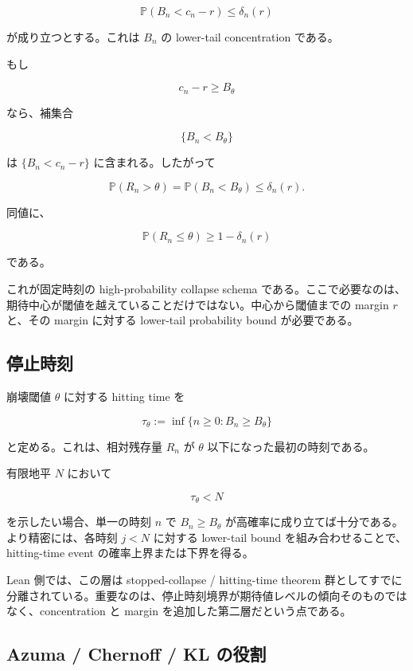 \documentclass[12pt,a4paper]{article}
\begin{document}
\[
\mathbb P(B_{n} < c_{n}-r) \le \delta_{n}(r)
\]

が成り立つとする。これは \(B_{n}\) の lower-tail concentration である。

もし

\[
c_{n}-r \ge B_\theta
\]

なら、補集合

\[
\{B_{n} < B_\theta\}
\]

は \(\{B_{n} < c_{n}-r\}\) に含まれる。したがって

\[
\mathbb P(R_{n} > \theta) = \mathbb P(B_{n} < B_\theta) \le \delta_{n}(r).
\]

同値に、

\[
\mathbb P(R_{n} \le \theta) \ge 1-\delta_{n}(r)
\]

である。

これが固定時刻の high-probability collapse schema である。ここで必要なのは、期待中心が閾値を越えていることだけではない。中心から閾値までの margin \(r\) と、その margin に対する lower-tail probability bound が必要である。

\subsection{停止時刻}\label{ux505cux6b62ux6642ux523b}

崩壊閾値 \(\theta\) に対する hitting time を

\[
\tau_\theta := \inf\{n \ge 0 : B_{n} \ge B_\theta\}
\]

と定める。これは、相対残存量 \(R_{n}\) が \(\theta\) 以下になった最初の時刻である。

有限地平 \(N\) において

\[
\tau_\theta < N
\]

を示したい場合、単一の時刻 \(n\) で \(B_{n}\ge B_\theta\) が高確率に成り立てば十分である。より精密には、各時刻 \(j<N\) に対する lower-tail bound を組み合わせることで、hitting-time event の確率上界または下界を得る。

Lean 側では、この層は stopped-collapse / hitting-time theorem 群としてすでに分離されている。重要なのは、停止時刻境界が期待値レベルの傾向そのものではなく、concentration と margin を追加した第二層だという点である。

\subsection{Azuma / Chernoff / KL の役割}\label{azuma-chernoff-kl-ux306eux5f79ux5272}
\end{document}
